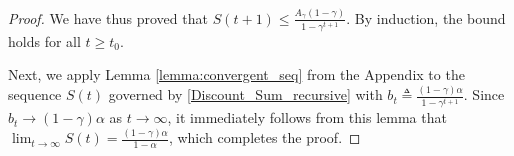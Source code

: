 \documentclass[conference]{IEEEtran}
\begin{document}
\begin{proof}
We have thus proved that $S(t+1)\leq \frac{A_\gamma(1-\gamma)}{1-\gamma^{t+1}}$. By induction, the bound holds for all $t \geq t_0$.

Next, we apply Lemma \ref{lemma:convergent_seq} from the Appendix to the sequence $S(t)$ governed by \eqref{Discount_Sum_recursive} with  $b_t \triangleq \frac{(1-\gamma)\alpha}{1-\gamma^{t+1}}$. Since $b_t{\to}(1{-}\gamma)\alpha$ as $t\to \infty$, it immediately follows from this lemma that $\lim_{t \to \infty} S(t) = \frac{(1-\gamma)\alpha}{1-\alpha}$, which completes the proof.
\end{proof}
    
\end{document}
